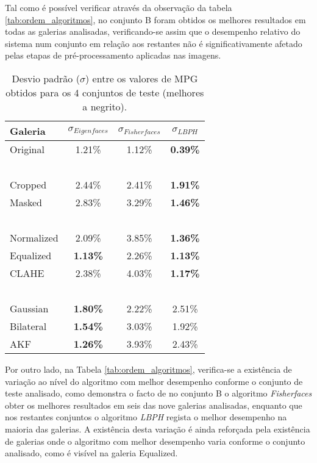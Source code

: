 Tal como é possível verificar através da observação da tabela \ref{tab:ordem_algoritmos}, no conjunto B foram obtidos os melhores resultados em todas as galerias analisadas, verificando-se assim que o desempenho relativo do sistema num conjunto em relação aos restantes não é significativamente afetado pelas etapas de pré-processamento aplicadas nas imagens.
\begin{center}
\begin{table}[t]
    \begin{center}
    \caption{Desvio padrão ($\sigma$) entre os valores de MPG obtidos para os 4 conjuntos de teste (melhores a negrito).}
    \begin{tabular}{l|ccc}
    Galeria    & $\sigma_{Eigenfaces}$ & $\sigma_{Fisherfaces}$ & $\sigma_{LBPH}$ \\ 
    \hline\hline
    Original   & 1.21\%          & 1.12\%           & \textbf{0.39\%}    \\
    ~ \\
    Cropped    & 2.44\%          & 2.41\%           & \textbf{1.91\%}    \\
    Masked     & 2.83\%          & 3.29\%           & \textbf{1.46\%}    \\
    ~ \\
    Normalized & 2.09\%          & 3.85\%           & \textbf{1.36\%}    \\
    Equalized  &\textbf{ 1.13\%} & 2.26\%           & \textbf{1.13\%}    \\
    CLAHE      & 2.38\%          & 4.03\%           & \textbf{1.17\%}    \\
    ~ \\
    Gaussian   & \textbf{1.80\%}          & 2.22\%           & 2.51\%             \\
    Bilateral  & \textbf{1.54\%}          & 3.03\%           & 1.92\%             \\
    AKF        & \textbf{1.26\%}          & 3.93\%           & 2.43\%             \\ 
    \hline\hline
    \end{tabular}
    \label{tab:desviopadrao}
    \end{center}
\end{table}
\end{center}
Por outro lado, na Tabela \ref{tab:ordem_algoritmos}, verifica-se a existência de variação ao nível do algoritmo com melhor desempenho conforme o conjunto de teste analisado, como demonstra o facto de no conjunto B o algoritmo \textit{Fisherfaces} obter os melhores resultados em seis das nove galerias analisadas, enquanto que nos restantes conjuntos o algoritmo \textit{LBPH} regista o melhor desempenho na maioria das galerias. A existência desta variação é ainda reforçada pela existência de galerias onde o algoritmo com melhor desempenho varia conforme o conjunto analisado, como é visível na galeria Equalized.

